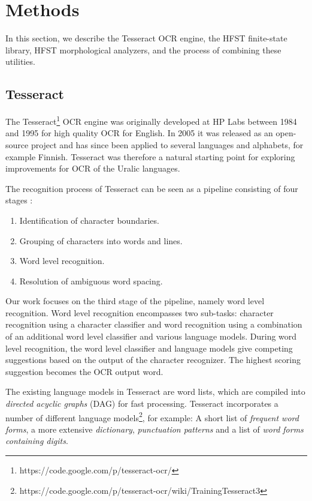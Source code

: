 \documentclass[b5paper]{article}
\begin{document}
\section{Methods}
\label{met} In this section, we describe the Tesseract OCR engine, the
HFST finite-state library, HFST morphological analyzers, and the
process of combining these utilities.

\subsection{Tesseract}
The Tesseract\footnote{https://code.google.com/p/tesseract-ocr/} OCR
engine \cite{smith07} was originally developed at HP Labs between 1984
and 1995 for high quality OCR for English. In 2005 it was released as
an open-source project and has since been applied to several languages
and alphabets, for example Finnish. Tesseract was therefore a natural
starting point for exploring improvements for OCR of the Uralic languages.

The recognition process of Tesseract can be seen as a pipeline
consisting of four stages \cite{smith07}:
\begin{enumerate}
\item Identification of character boundaries.
\item Grouping of characters into words and lines.
\item Word level recognition.
\item Resolution of ambiguous word spacing.
\end{enumerate}

Our work focuses on the third stage of the pipeline, namely word level
recognition. Word level recognition encompasses two sub-tasks: character
recognition using a character classifier and word recognition using a
combination of an additional word level classifier and various
language models. During word level recognition, the word level classifier
and language models give competing suggestions based on the output of
the character recognizer. 
The highest scoring suggestion becomes the OCR output word.

The existing language models in Tesseract are word lists, which are
compiled into {\it directed acyclic graphs} (DAG) for fast
processing. Tesseract incorporates a number of different language
models\footnote{https://code.google.com/p/tesseract-ocr/wiki/TrainingTesseract3},
for example: A short list of {\it frequent word forms}, a more
extensive {\it dictionary}, {\it punctuation patterns} and a list of
{\it word forms containing digits}.
\end{document}
